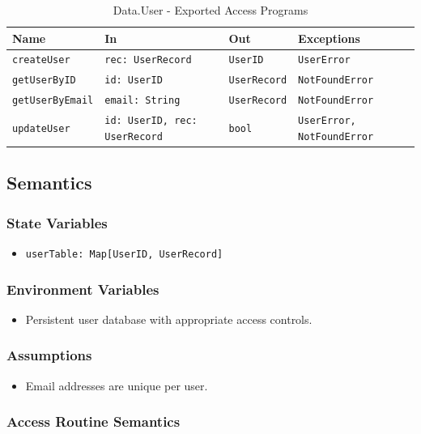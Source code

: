 \documentclass[12pt, titlepage]{article}
\begin{document}
\begin{table}[H]
\centering
\small
\caption{Data.User - Exported Access Programs}
\begin{tabular}{p{3.3cm} p{3.5cm} p{3.2cm} p{4cm}}
\toprule
\textbf{Name} & \textbf{In} & \textbf{Out} & \textbf{Exceptions} \\
\midrule
\texttt{createUser} & \texttt{rec: UserRecord} & \texttt{UserID} & \texttt{UserError} \\
\texttt{getUserByID} & \texttt{id: UserID} & \texttt{UserRecord} & \texttt{NotFoundError} \\
\texttt{getUserByEmail} & \texttt{email: String} & \texttt{UserRecord} & \texttt{NotFoundError} \\
\texttt{updateUser} & \texttt{id: UserID, rec: UserRecord} & \texttt{bool} & \texttt{UserError, NotFoundError} \\
\bottomrule
\end{tabular}
\end{table}

\subsection{Semantics}

\subsubsection{State Variables}
\begin{itemize}
    \item \texttt{userTable: Map[UserID, UserRecord]}
\end{itemize}

\subsubsection{Environment Variables}
\begin{itemize}
    \item Persistent user database with appropriate access controls.
\end{itemize}

\subsubsection{Assumptions}
\begin{itemize}
    \item Email addresses are unique per user.
\end{itemize}

\subsubsection{Access Routine Semantics}
\end{document}
